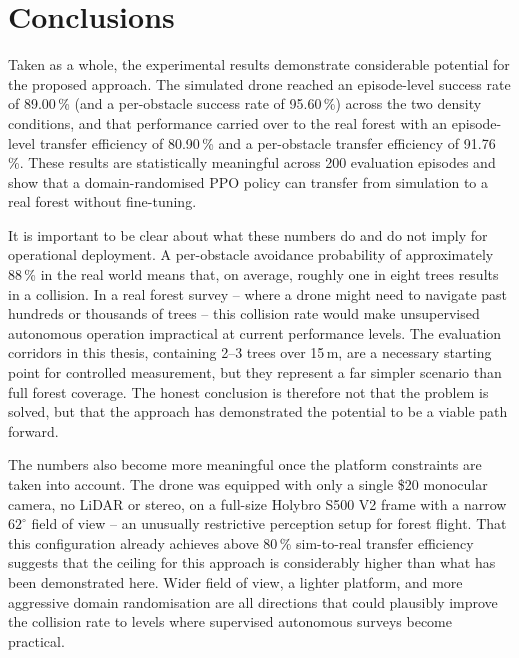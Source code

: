 \documentclass[../main.tex]{subfiles}
\begin{document}
\section{Conclusions}
\justify

Taken as a whole, the experimental results demonstrate considerable potential for the proposed approach. The simulated drone reached an episode-level success rate of 89.00\,\% (and a per-obstacle success rate of 95.60\,\%) across the two density conditions, and that performance carried over to the real forest with an episode-level transfer efficiency of 80.90\,\% and a per-obstacle transfer efficiency of 91.76\,\%. These results are statistically meaningful across 200 evaluation episodes and show that a domain-randomised PPO policy can transfer from simulation to a real forest without fine-tuning.

It is important to be clear about what these numbers do and do not imply for operational deployment. A per-obstacle avoidance probability of approximately 88\,\% in the real world means that, on average, roughly one in eight trees results in a collision. In a real forest survey -- where a drone might need to navigate past hundreds or thousands of trees -- this collision rate would make unsupervised autonomous operation impractical at current performance levels. The evaluation corridors in this thesis, containing 2--3 trees over 15\,m, are a necessary starting point for controlled measurement, but they represent a far simpler scenario than full forest coverage. The honest conclusion is therefore not that the problem is solved, but that the approach has demonstrated the potential to be a viable path forward.

The numbers also become more meaningful once the platform constraints are taken into account. The drone was equipped with only a single \$20 monocular camera, no LiDAR or stereo, on a full-size Holybro S500 V2 frame with a narrow $62^{\circ}$ field of view -- an unusually restrictive perception setup for forest flight. That this configuration already achieves above 80\,\% sim-to-real transfer efficiency suggests that the ceiling for this approach is considerably higher than what has been demonstrated here. Wider field of view, a lighter platform, and more aggressive domain randomisation are all directions that could plausibly improve the collision rate to levels where supervised autonomous surveys become practical.
\end{document}
